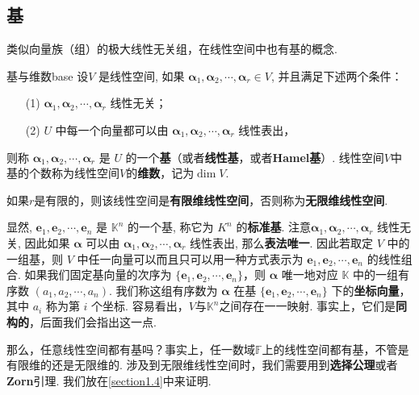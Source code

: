 \documentclass[12pt, a4paper,newtx]{ctexart}
\begin{document}
\subsection{基}
类似向量族（组）的极大线性无关组，在线性空间中也有基的概念. \begin{definition}{基与维数}{base}
	设$V$ 是线性空间, 如果 $\bm\alpha_1, \bm\alpha_2, \cdots, \bm\alpha_r \in V$, 并且满足下述两个条件：\begin{enumerate}
		\item[(1)] $\bm\alpha_1, \bm\alpha_2, \cdots, \bm\alpha_r$ 线性无关；
		\item[(2)] $U$ 中每一个向量都可以由 $\bm\alpha_1, \bm\alpha_2, \cdots, \bm\alpha_r$ 线性表出，
	\end{enumerate}
	则称 $\bm\alpha_1, \bm\alpha_2, \cdots, \bm\alpha_r$ 是 $U$ 的一个\textbf{基}（或者\textbf{线性基}，或者\textbf{Hamel基}）. 线性空间$V$中基的个数称为线性空间$V$的\textbf{维数}，记为$\dim V.$
	
	如果$r$是有限的，则该线性空间是\textbf{有限维线性空间}，否则称为\textbf{无限维线性空间}. 
\end{definition}
显然, $\bm e_1, \bm e_2, \cdots, \bm e_n$ 是 $\mathbb K^n$ 的一个基, 称它为 $K^n$ 的\textbf{标准基}. 注意$\bm\alpha_1, \bm\alpha_2, \cdots, \bm\alpha_r$ 线性无关, 因此如果 $\bm\alpha$ 可以由 $\bm\alpha_1, \bm\alpha_2, \cdots, \bm\alpha_r$ 线性表出, 那么\textbf{表法唯一}. 因此若取定 $V$ 中的一组基，则 $V$ 中任一向量可以而且只可以用一种方式表示为 $\bm e_1, \bm e_2, \cdots, \bm e_n$ 的线性组合. 如果我们固定基向量的次序为 $\{\bm e_1, \bm e_2, \cdots, \bm e_n\}$，则 $\bm \alpha$ 唯一地对应 $\mathbb{K}$ 中的一组有序数 $(a_1, a_2, \cdots, a_n)$. 我们称这组有序数为 $\bm \alpha$ 在基 $\{\bm e_1, \bm e_2, \cdots, \bm e_n\}$ 下的\textbf{坐标向量}，其中 $a_i$ 称为第 $i$ 个坐标. 容易看出，$V$与$\mathbb K^n$之间存在一一映射. 事实上，它们是\textbf{同构的}，后面我们会指出这一点. 

那么，任意线性空间都有基吗？事实上，任一数域$\mathbb F$上的线性空间都有基，不管是有限维的还是无限维的. 涉及到无限维线性空间时，我们需要用到\textbf{选择公理}或者\textbf{Zorn}引理. 我们放在\ref{section1.4}中来证明. 
\end{document}
